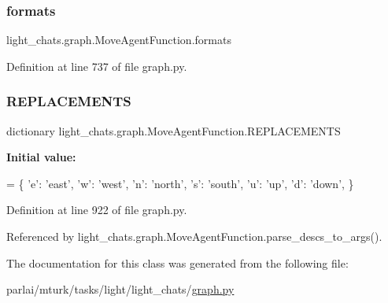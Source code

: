 \subsubsection{\texorpdfstring{formats}{formats}}
{\footnotesize\ttfamily light\+\_\+chats.\+graph.\+Move\+Agent\+Function.\+formats}



Definition at line 737 of file graph.\+py.

\mbox{\label{classlight__chats_1_1graph_1_1MoveAgentFunction_a15fb97abe73c7e378d6d4d04dedcd13b}} 
\subsubsection{\texorpdfstring{R\+E\+P\+L\+A\+C\+E\+M\+E\+N\+TS}{REPLACEMENTS}}
{\footnotesize\ttfamily dictionary light\+\_\+chats.\+graph.\+Move\+Agent\+Function.\+R\+E\+P\+L\+A\+C\+E\+M\+E\+N\+TS\hspace{0.3cm}{\ttfamily [static]}}

{\bfseries Initial value\+:}
\begin{DoxyCode}
=  \{
        \textcolor{stringliteral}{'e'}: \textcolor{stringliteral}{'east'},
        \textcolor{stringliteral}{'w'}: \textcolor{stringliteral}{'west'},
        \textcolor{stringliteral}{'n'}: \textcolor{stringliteral}{'north'},
        \textcolor{stringliteral}{'s'}: \textcolor{stringliteral}{'south'},
        \textcolor{stringliteral}{'u': '}up',
        \textcolor{stringliteral}{'d'}: \textcolor{stringliteral}{'down'},
    \}
\end{DoxyCode}


Definition at line 922 of file graph.\+py.



Referenced by light\+\_\+chats.\+graph.\+Move\+Agent\+Function.\+parse\+\_\+descs\+\_\+to\+\_\+args().



The documentation for this class was generated from the following file\+:\begin{DoxyCompactItemize}
\item 
parlai/mturk/tasks/light/light\+\_\+chats/\hyperlink{parlai_2mturk_2tasks_2light_2light__chats_2graph_8py}{graph.\+py}\end{DoxyCompactItemize}
